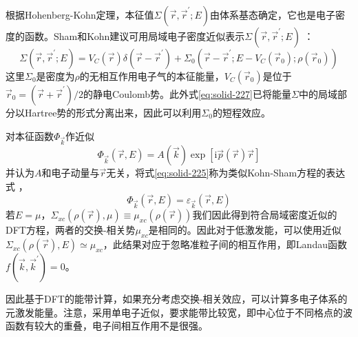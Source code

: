 {%

根据Hohenberg-Kohn定理，本征值$\Sigma(\vec r,\vec r^{\prime};E)$由体系基态确定，它也是电子密度的函数。Sham和Kohn建议可用局域电子密度近似表示$\Sigma(\vec r,\vec r^{\prime};E)$%
：
\begin{equation}
  \Sigma(\vec r,\vec r^{\prime};E)=V_C(\vec r)\delta(\vec r-\vec r^{\prime})+\Sigma_0(\vec r-\vec r^{\prime};E-V_C(\vec r_0);\rho(\vec r_0))
  \label{eq:solid-227}
\end{equation}
这里$\Sigma_0$是密度为$\rho$的无相互作用电子气的本征能量，$V_C(\vec r_0)$是位于$\vec r_0=(\vec r+\vec r^{\prime})/2$的静电Coulomb势。此外式\eqref{eq:solid-227}已将能量$\Sigma$中的局域部分以Hartree势的形式分离出来，因此可以利用$\Sigma_0$的短程效应。

对本征函数$\Phi_{\vec k}$作近似
$$\Phi_{\vec k}(\vec r,E)=A(\vec k)\exp[\mathrm{i}\vec p(\vec r)\vec r]$$
并认为$A$和电子动量与$\vec r$无关，将式\eqref{eq:solid-225}称为类似Kohn-Sham方程的表达式%
，
\begin{equation}
  [-\dfrac12\nabla^2+V_C(\vec r)+\Sigma_{xc}(\rho(\vec r),E)]\Phi_{\vec k}(\vec r,E)=\varepsilon_{\vec k}(\vec r,E)
  \label{eq:solid-228}
\end{equation}
若$E=\mu$，$\Sigma_{xc}(\rho(\vec r),\mu)\equiv\mu_{xc}(\rho(\vec r))$我们因此得到符合局域密度近似的DFT方程，两者的交换-相关势$\mu_{xc}$是相同的。因此对于低激发能，可以使用近似$\Sigma_{xc}(\rho(\vec r),E)\simeq\mu_{xc}$，此结果对应于忽略准粒子间的相互作用，即Landau函数$f(\vec k,\vec k^{\prime})=0$。

因此基于DFT的能带计算，如果充分考虑交换-相关效应，可以计算多电子体系的元激发能量。注意，采用单电子近似，要求能带比较宽，即中心位于不同格点的波函数有较大的重叠，电子间相互作用不是很强。

}
